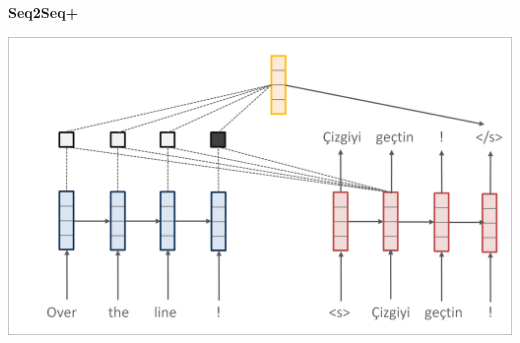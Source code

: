 \documentclass[aspectratio=169]{beamer}
\newcommand{\air}{\vspace{0.25cm}}
\begin{document}
\begin{frame}
  \begin{center}
    \textbf{Seq2Seq+} \air

  \end{center}
\center
\vspace{-5mm}
 \air
\includegraphics[scale=0.37]{nmt-attn10}
\end{frame}











\end{document}
